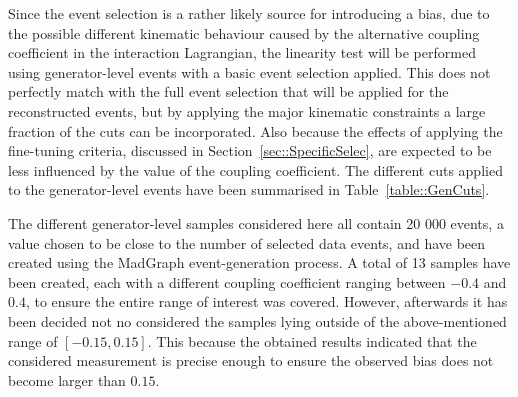 Since the event selection is a rather likely source for introducing a bias, due to the possible different kinematic behaviour caused by the alternative coupling coefficient in the interaction Lagrangian, the linearity test will be performed using generator-level events with a basic event selection applied.
This does not perfectly match with the full event selection that will be applied for the reconstructed events, but by applying the major kinematic constraints a large fraction of the cuts can be incorporated. Also because the effects of applying the fine-tuning criteria, discussed in Section~\ref{sec::SpecificSelec}, are expected to be less influenced by the value of the coupling coefficient. The different cuts applied to the generator-level events have been summarised in Table~\ref{table::GenCuts}.


The different generator-level samples considered here all contain 20 000 events, a value chosen to be close to the number of selected data events, and have been created using the MadGraph event-generation process. A total of 13 samples have been created, each with a different coupling coefficient ranging between $-0.4$ and $0.4$, to ensure the entire range of interest was covered. 
However, afterwards it has been decided not no considered the samples lying outside of the above-mentioned range of $\left[-0.15, 0.15\right]$. This because the obtained results indicated that the considered measurement is precise enough to ensure the observed bias does not become larger than $0.15$.
\\

